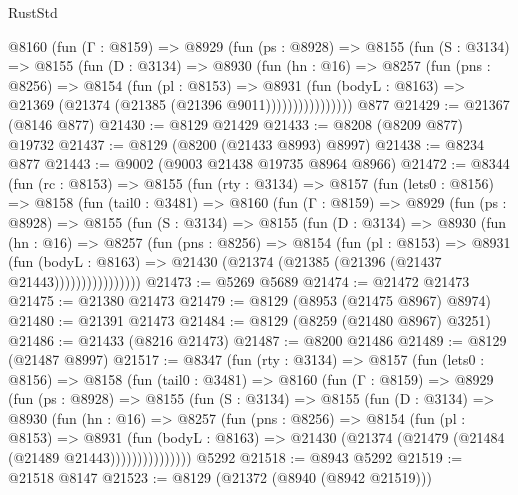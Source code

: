 \begin{lexlean}{RustStd}
\begin{coremodule}
            @8160
              (fun (Γ : @8159) =>
              @8929
                (fun (ps : @8928) =>
                @8155
                  (fun (S : @3134) =>
                  @8155
                    (fun (D : @3134) =>
                    @8930
                      (fun (hn : @16) =>
                      @8257
                        (fun (pns : @8256) =>
                        @8154
                          (fun (pl : @8153) =>
                          @8931
                            (fun (bodyL : @8163) =>
                            @21369 (@21374 (@21385 (@21396 @9011))))))))))))))))
    @877
@21429 := @21367 (@8146 @877)
@21430 := @8129 @21429
@21433 := @8208 (@8209 @877) @19732
@21437 := @8129 (@8200 (@21433 @8993) @8997)
@21438 := @8234 @877
@21443 := @9002 (@9003 @21438 @19735 @8964 @8966)
@21472 := @8344
    (fun (rc : @8153) =>
    @8155
      (fun (rty : @3134) =>
      @8157
        (fun (lets0 : @8156) =>
        @8158
          (fun (tail0 : @3481) =>
          @8160
            (fun (Γ : @8159) =>
            @8929
              (fun (ps : @8928) =>
              @8155
                (fun (S : @3134) =>
                @8155
                  (fun (D : @3134) =>
                  @8930
                    (fun (hn : @16) =>
                    @8257
                      (fun (pns : @8256) =>
                      @8154
                        (fun (pl : @8153) =>
                        @8931
                          (fun (bodyL : @8163) =>
                          @21430 (@21374 (@21385 (@21396 (@21437 @21443))))))))))))))))
@21473 := @5269 @5689
@21474 := @21472 @21473
@21475 := @21380 @21473
@21479 := @8129 (@8953 (@21475 @8967) @8974)
@21480 := @21391 @21473
@21484 := @8129 (@8259 (@21480 @8967) @3251)
@21486 := @21433 (@8216 @21473)
@21487 := @8200 @21486
@21489 := @8129 (@21487 @8997)
@21517 := @8347
    (fun (rty : @3134) =>
    @8157
      (fun (lets0 : @8156) =>
      @8158
        (fun (tail0 : @3481) =>
        @8160
          (fun (Γ : @8159) =>
          @8929
            (fun (ps : @8928) =>
            @8155
              (fun (S : @3134) =>
              @8155
                (fun (D : @3134) =>
                @8930
                  (fun (hn : @16) =>
                  @8257
                    (fun (pns : @8256) =>
                    @8154
                      (fun (pl : @8153) =>
                      @8931
                        (fun (bodyL : @8163) =>
                        @21430 (@21374 (@21479 (@21484 (@21489 @21443)))))))))))))))
    @5292
@21518 := @8943 @5292
@21519 := @21518 @8147
@21523 := @8129 (@21372 (@8940 (@8942 @21519)))

\end{coremodule}
\end{lexlean}
